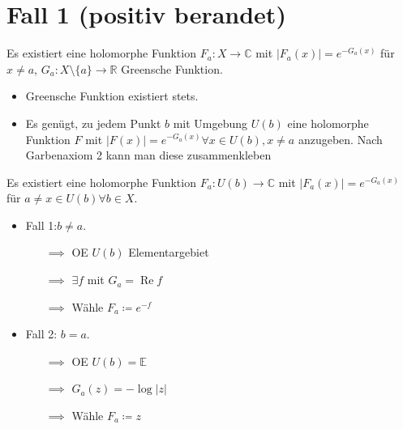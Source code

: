 \documentclass{beamer}
\newcommand{\R}{\mathbb{R}}
\newcommand{\C}{\mathbb{C}}
\newcommand{\E}{\mathbb{E}}
\renewcommand{\Re}{\operatorname{Re}}
\begin{document}
    \section{Fall 1 (positiv berandet)}
    
    \begin{frame}
        \begin{lemma}
            Es existiert eine holomorphe Funktion $F_a\colon X \to \C$ mit $|F_a(x)| = e^{-G_a(x)}$ für $x \neq a$, $G_a\colon X \setminus \{a\} \to \R$ Greensche Funktion.
        \end{lemma}
        \begin{itemize}
            \item Greensche Funktion existiert stets.
            \item Es genügt, zu jedem Punkt $b$ mit Umgebung $U(b)$ eine holomorphe Funktion $F$ mit $|F(x)| = e^{-G_a(x)} \forall x \in U(b), x \neq a$ anzugeben. Nach Garbenaxiom 2 kann man diese zusammenkleben
        \end{itemize}
    \end{frame}
    \begin{frame}
        \begin{lemma}
            Es existiert eine holomorphe Funktion $F_a\colon U(b) \to \C$ mit $|F_a(x)| = e^{-G_a(x)}$ für $a \neq x \in U(b) \forall b \in X$.
        \end{lemma}
        \begin{itemize} 
            \item Fall 1:$b \neq a$.
            \begin{itemize}
                \item[$\implies$] OE $U(b)$ Elementargebiet
                \item[$\implies$] $\exists f$ mit $G_a = \Re f$
                \item[$\implies$] Wähle $F_a \coloneqq e^{-f}$
            \end{itemize}
            \item Fall 2: $b = a$. 
            \begin{itemize}
                \item[$\implies$] OE $U(b) = \E$
                \item[$\implies$] $G_a(z) = -\log|z|$
                \item[$\implies$] Wähle $F_a \coloneqq z$
            \end{itemize}
        \end{itemize}
    \end{frame}
\end{document}
